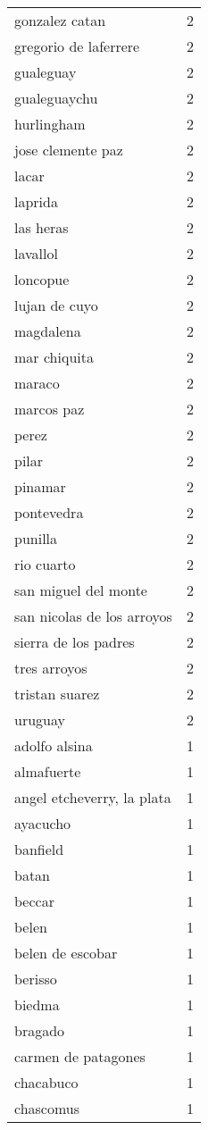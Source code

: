 \documentclass[
]{article}
\begin{document}
\begin{longtable}[t]{lr}
\addlinespace
gonzalez catan & 2\\
gregorio de laferrere & 2\\
gualeguay & 2\\
gualeguaychu & 2\\
hurlingham & 2\\
\addlinespace
jose clemente paz & 2\\
lacar & 2\\
laprida & 2\\
las heras & 2\\
lavallol & 2\\
\addlinespace
loncopue & 2\\
lujan de cuyo & 2\\
magdalena & 2\\
mar chiquita & 2\\
maraco & 2\\
\addlinespace
marcos paz & 2\\
perez & 2\\
pilar & 2\\
pinamar & 2\\
pontevedra & 2\\
\addlinespace
punilla & 2\\
rio cuarto & 2\\
san miguel del monte & 2\\
san nicolas de los arroyos & 2\\
sierra de los padres & 2\\
\addlinespace
tres arroyos & 2\\
tristan suarez & 2\\
uruguay & 2\\
adolfo alsina & 1\\
almafuerte & 1\\
\addlinespace
angel etcheverry, la plata & 1\\
ayacucho & 1\\
banfield & 1\\
batan & 1\\
beccar & 1\\
\addlinespace
belen & 1\\
belen de escobar & 1\\
berisso & 1\\
biedma & 1\\
bragado & 1\\
\addlinespace
carmen de patagones & 1\\
chacabuco & 1\\
chascomus & 1\\

\end{longtable}
\end{document}
